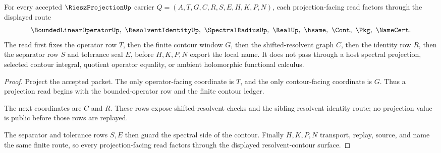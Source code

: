 \begin{theorem}
\label{thm:riesz-projection-resolvent-contour-route}
For every accepted $\RieszProjectionUp$ carrier $Q=(A,T,G,C,R,S,E,H,K,P,N)$, each projection-facing read factors through the displayed route
$$
\BoundedLinearOperatorUp,\ \ResolventIdentityUp,\ \SpectralRadiusUp,\ \RealUp,\ \hsame,\ \Cont,\ \Pkg,\ \NameCert .
$$
The read first fixes the operator row $T$, then the finite contour window $G$, then the shifted-resolvent graph $C$, then the identity row $R$, then the separator row $S$ and tolerance seal $E$, before $H,K,P,N$ export the local name. It does not pass through a host spectral projection, selected contour integral, quotient operator equality, or ambient holomorphic functional calculus.
\end{theorem}
\begin{proof}
Project the accepted packet. The only operator-facing coordinate is $T$, and the only contour-facing coordinate is $G$. Thus a projection read begins with the bounded-operator row and the finite contour ledger.

The next coordinates are $C$ and $R$. These rows expose shifted-resolvent checks and the sibling resolvent identity route; no projection value is public before those rows are replayed.

The separator and tolerance rows $S,E$ then guard the spectral side of the contour. Finally $H,K,P,N$ transport, replay, source, and name the same finite route, so every projection-facing read factors through the displayed resolvent-contour surface.
\end{proof}



